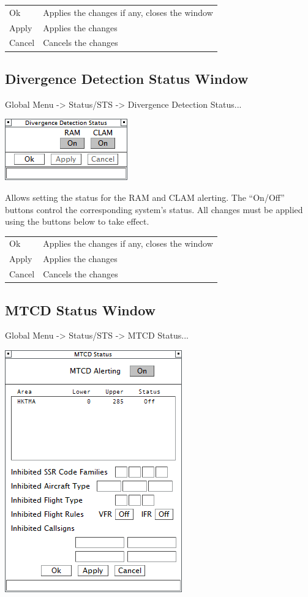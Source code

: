 \documentclass[11pt,a4paper]{memoir}
\begin{document}
\begin{tabular}{l l}
    Ok      & Applies the changes if any, closes the window\\
    Apply   & Applies the changes\\
    Cancel  & Cancels the changes\\
\end{tabular}

\subsection{Divergence Detection Status Window}
\label{win:ddsw}

Global Menu -> Status/STS -> Divergence Detection Status...

\includegraphics{img/divsts.png}

Allows setting the status for the RAM and CLAM alerting. The “On/Off” buttons control the corresponding system’s status. All changes must be applied using the buttons below to take effect.

\begin{tabular}{l l}
    Ok      & Applies the changes if any, closes the window\\
    Apply   & Applies the changes\\
    Cancel  & Cancels the changes\\
\end{tabular}

\subsection{MTCD Status Window}
\label{win:mtcdsw}

Global Menu -> Status/STS -> MTCD Status...

\includegraphics{img/mtcd.png}
\end{document}
